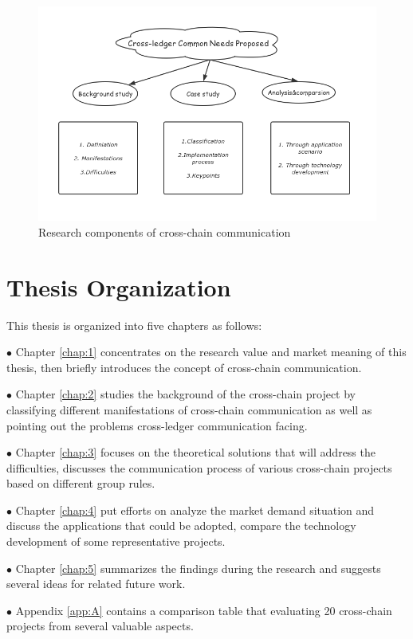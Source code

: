     
    \begin{figure}[H]
    \includegraphics[width=1\textwidth]{./figures/contri.png}
    \centering
    \caption{Research components of cross-chain communication}%
    \centering
    \label{fig:contri}
    \end{figure}
    
\section{Thesis Organization}

This thesis is organized into five chapters as follows:

$\bullet $ Chapter \ref{chap:1} concentrates on the research value and market meaning of this thesis, then briefly introduces the concept of cross-chain communication.

$\bullet $ Chapter \ref{chap:2} studies the background of the cross-chain project by classifying different manifestations of cross-chain communication as well as pointing out the problems cross-ledger communication facing.

$\bullet $ Chapter \ref{chap:3} focuses on the theoretical solutions that will address the difficulties, discusses the communication process of various cross-chain projects based on different group rules. 

$\bullet $ Chapter \ref{chap:4} put efforts on analyze the market demand situation and discuss the applications that could be adopted, compare the technology development of some representative projects.

$\bullet $ Chapter \ref{chap:5} summarizes the findings during the research and suggests several ideas for related future work.

$\bullet $ Appendix \ref{app:A} contains a comparison table that evaluating 20 cross-chain projects from several valuable aspects.